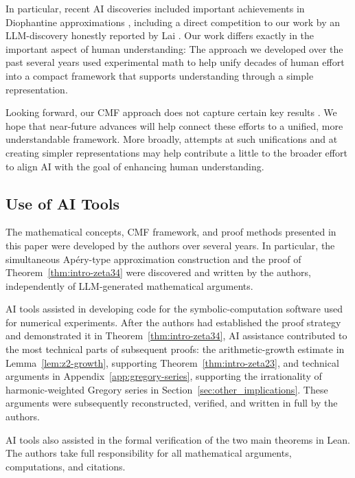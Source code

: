 \documentclass[oneside,english,11pt]{amsart}
\begin{document}
In particular, recent AI discoveries included important achievements in Diophantine approximations \cite{openai2026catalan,fauzan2026}, including a direct competition to our work by an LLM-discovery honestly reported by Lai \cite{lai2026zeta34}.
Our work differs exactly in the important aspect of human understanding: The approach we developed over the past several years used experimental math to help unify decades of human effort into a compact framework that supports understanding through a simple representation.

Looking forward, our CMF approach does not capture certain key results \cite{fauzan2026, lai2026zeta34, openai2026catalan, calegari2024linear}.
We hope that near-future advances will help connect these efforts to a unified, more understandable framework. 
More broadly, attempts at such unifications and at creating simpler representations may help contribute a little to the broader effort to align AI with the goal of enhancing human understanding.


\subsection*{Use of AI Tools}
The mathematical concepts, CMF framework, and proof methods presented in this paper were developed by the authors over several years. 
In particular, the simultaneous Ap\'ery-type approximation construction and the proof of Theorem~\ref{thm:intro-zeta34} were discovered and written by the authors, independently of LLM-generated mathematical arguments.

AI tools assisted in developing code for the symbolic-computation software used for numerical experiments. 
After the authors had established the proof strategy and demonstrated it in Theorem~\ref{thm:intro-zeta34}, AI assistance contributed to the most technical parts 
of subsequent proofs:
the arithmetic-growth estimate in Lemma~\ref{lem:z2-growth}, supporting Theorem~\ref{thm:intro-zeta23}, and technical arguments in Appendix~\ref{app:gregory-series}, supporting the irrationality of 
harmonic-weighted Gregory series in Section~\ref{sec:other_implications}. 
These arguments were subsequently reconstructed, verified, and written in full by the authors.

AI tools also assisted in the formal verification of the two main theorems in Lean. 
The authors take full responsibility for all mathematical arguments, computations, and citations.
\end{document}
